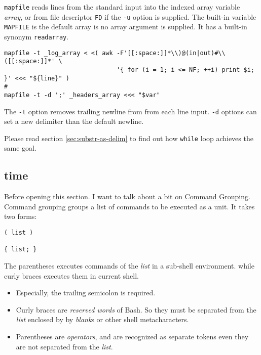 \lstinline|mapfile| reads lines from the standard input into the
indexed array variable \textit{array}, or from file descriptor
\lstinline|FD| if the \lstinline|-u| option is supplied.  The
built-in variable \lstinline|MAPFILE| is the default array is no
array argument is supplied. It has a built-in synonym
\lstinline|readarray|.

\begin{minipage}{1.0\linewidth}
\begin{lstlisting}
mapfile -t _log_array < <( awk -F'[[:space:]]*\\)@(in|out)#\\([[:space:]]*' \
                               '{ for (i = 1; i <= NF; ++i) print $i; }' <<< "${line}" )
#
mapfile -t -d ';' _headers_array <<< "$var"
\end{lstlisting}
\end{minipage}

The \lstinline|-t| option removes trailing newline from from each
line input. \lstinline|-d| options can set a new delimiter than
the default newline.

Please read section \ref{sec:substr-as-delim} to find out how
\lstinline|while| loop achieves the same goal.

\subsection{time}
\label{sec:bash-time}

Before opening this section. I want to talk about a bit on
\href{https://www.gnu.org/software/bash/manual/bash.html#Compound-Commands}{Command
  Grouping}. Command grouping groups a list of commands to be
executed as a unit. It takes two forms:

\begin{lstlisting}
( list )

{ list; }
\end{lstlisting}

The parentheses executes commands of the \textit{list} in a
sub-shell environment. while curly braces executes them in current
shell.

\begin{itemize}
\item Especially, the trailing semicolon is required.
\item Curly braces are \textit{reserved words} of Bash. So they must be
  separated from the \textit{list} enclosed by by \textit{blank}s
  or other shell metacharacters.
\item Parentheses are \textit{operators}, and are recognized as
  separate tokens even they are not separated from the \textit{list}.
\end{itemize}


